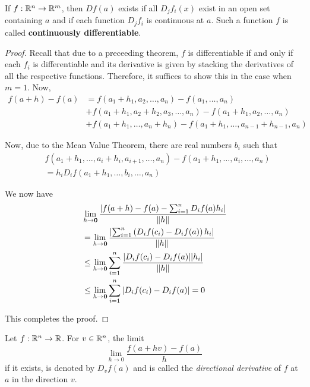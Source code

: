 \begin{theorem}
    If $f:\mathbb{R}^n\to\mathbb{R}^m$, then $Df(a)$ exists if all $D_jf_i(x)$ exist in an open set containing $a$ and if each function $D_jf_i$ is continuous at $a$. Such a function $f$ is called \textbf{continuously differentiable}.
\end{theorem}
\begin{proof}
    Recall that due to a preceeding theorem, $f$ is differentiable if and only if each $f_i$ is differentiable and its derivative is given by stacking the derivatives of all the respective functions. Therefore, it suffices to show this in the case when $m = 1$. Now, 
    \begin{align*}
        f(a +h) - f(a) &= f(a_1 + h_1,a_2,\ldots,a_n) - f(a_1,\ldots,a_n)\\
                       &+ f(a_1 + h_1, a_2 + h_2, a_3,\ldots, a_n) - f(a_1 + h_1,a_2,\ldots,a_n)\\
                       &+ f(a_1 + h_1,\ldots, a_n + h_n) - f(a_1 + h_1,\ldots,a_{n - 1} + h_{n - 1}, a_n)
    \end{align*}

    Now, due to the Mean Value Theorem, there are real numbers $b_i$ such that 
    \begin{align*}
        &f(a_1 + h_1,\ldots,a_i + h_i,a_{i + 1},\ldots,a_n) - f(a_1 + h_1,\ldots,a_i,\ldots,a_n)\\
        &= h_iD_if(a_1 + h_1,\ldots, b_i,\ldots, a_n)
    \end{align*}

    We now have 
    \begin{align*}
        &\lim_{h\to\mathbf{0}}\frac{|f(a + h) - f(a) - \sum_{i = 1}^nD_if(a)h_i|}{\|h\|}\\
        &= \lim_{h\to\mathbf{0}}\frac{\left|\sum_{i = 1}^n\left(D_if(c_i) - D_if(a)\right)h_i\right|}{\|h\|}\\
        &\le\lim_{h\to\mathbf{0}}\sum_{i = 1}^n\frac{|D_if(c_i) - D_if(a)||h_i|}{\|h\|}\\
        &\le\lim_{h\to\mathbf{0}}\sum_{i = 1}^n|D_if(c_i) - D_if(a)| = 0
    \end{align*}

    This completes the proof.
\end{proof}

\begin{definition}
    Let $f:\mathbb{R}^n\to\mathbb{R}$. For $v\in\mathbb{R}^n$, the limit 
    \begin{equation*}
        \lim_{h\to0}\frac{f(a + hv) - f(a)}{h}
    \end{equation*}
    if it exists, is denoted by $D_vf(a)$ and is called the \textit{directional derivative} of $f$ at $a$ in the direction $v$.
\end{definition}

